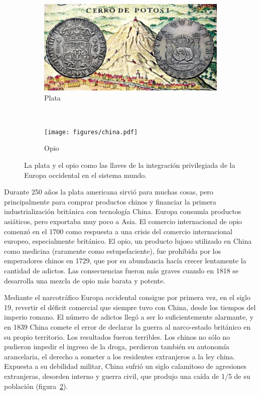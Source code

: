 \documentclass[a4paper,10pt]{book}
\theoremstyle{definition}
\begin{document}
\begin{figure}[ht!]     
  \centering 
  \begin{subfigure}[b]{0.48\textwidth}
    \includegraphics[width=\textwidth]{static/plata-potosi} 
    \caption{Plata}
    \label{fig:potosi}
  \end{subfigure}
   \ \ 
  \begin{subfigure}[b]{0.47\textwidth}
    \texttt{[image: figures/china.pdf]} 
   \caption{Opio}
    \label{fig:china-pop}
  \end{subfigure}
  \caption{La plata y el opio como las llaves de la integración privilegiada de la Europa occidental en el sistema mundo.}
  \label{fig:integracion}
\end{figure}

Durante 250 años la plata americana sirvió para muchas cosas, pero principalmente para comprar productos chinos y financiar la primera industrialización británica con tecnología China.
Europa consumía productos asiáticos, pero exportaba muy poco a Asia.
El comercio internacional de opio comenzó en el 1700 como respuesta a una crisis del comercio internacional europeo, especialmente británico.
El opio, un producto lujoso utilizado en China como medicina (raramente como estupefaciente), fue prohibida por los emperadores chinos en 1729, que por su abundancia hacía crecer lentamente la cantidad de adictos.
Las consecuencias fueron más graves cuando en 1818 se desarrolla una mezcla de opio más barata y potente.


Mediante el narcotráfico Europa occidental consigue por primera vez, en el siglo 19, revertir el déficit comercial que siempre tuvo con China, desde los tiempos del imperio romano.
El número de adictos llegó a ser lo suficientemente alarmante, y en 1839 China comete el error de declarar la guerra al narco-estado británico en su propio territorio.
Los resultados fueron terribles.
Los chinos no sólo no pudieron impedir el ingreso de la droga, perdieron también su autonomía arancelaria, el derecho a someter a los residentes extranjeros a la ley china.
Expuesta a su debilidad militar, China sufrió un siglo calamitoso de agresiones extranjeras, desorden interno y guerra civil, que produjo una caída de 1/5 de su población (figura~\ref{fig:china-pop}).
\end{document}
